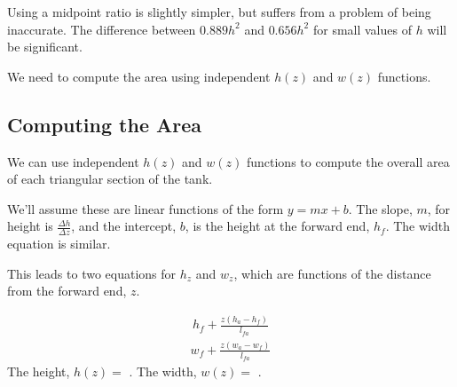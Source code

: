 \documentclass[letterpaper,10pt,english]{sphinxmanual}
\begin{document}
\sphinxAtStartPar
Using a midpoint ratio is slightly simpler, but suffers from a problem of being inaccurate. The difference between \(0.889h^2\) and \(0.656h^2\) for small values of \(h\) will be significant.

\sphinxAtStartPar
We need to compute the area using independent \(h(z)\) and \(w(z)\) functions.


\subsection{Computing the Area}
\label{\detokenize{prism-irregular:computing-the-area}}
\sphinxAtStartPar
We can use independent \(h(z)\) and \(w(z)\) functions to compute the overall area of each triangular section of the tank.

\sphinxAtStartPar
We’ll assume these are linear functions of the form \(y = mx + b\). The slope, \(m\), for height is \(\frac{\Delta h}{\Delta z}\), and the intercept, \(b\), is the height at the forward end, \(h_f\). The width equation is similar.

\sphinxAtStartPar
This leads to two equations for \(h_z\) and \(w_z\), which are functions of the distance from the forward end, \(z\).

\begin{sphinxVerbatim}[commandchars=\\\{\}]
          
 
          
 
\end{sphinxVerbatim}
\begin{equation*}
\begin{split}\displaystyle h_{f} + \frac{z \left(h_{a} - h_{f}\right)}{l_{fa}}\end{split}
\end{equation*}\begin{equation*}
\begin{split}\displaystyle w_{f} + \frac{z \left(w_{a} - w_{f}\right)}{l_{fa}}\end{split}
\end{equation*}
\sphinxAtStartPar
The height, \(h(z) =\) . The width, \(w(z) =\) .
\end{document}
